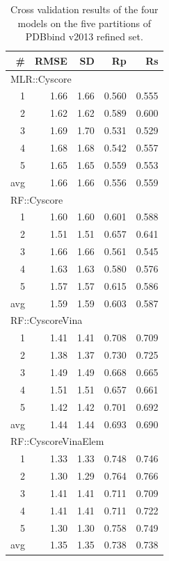 \documentclass[journal=jacsat,manuscript=article]{achemso}
\begin{document}
\begin{table}
\caption{Cross validation results of the four models on the five partitions of PDBbind v2013 refined set.}
\label{tbl:cv}
\begin{tabular}{rrrrr}
\hline
\# & RMSE & SD & Rp & Rs\\
\hline
\multicolumn{5}{l}{MLR::Cyscore}\\
  1 & 1.66 & 1.66 & 0.560 & 0.555\\
  2 & 1.62 & 1.62 & 0.589 & 0.600\\
  3 & 1.69 & 1.70 & 0.531 & 0.529\\
  4 & 1.68 & 1.68 & 0.542 & 0.557\\
  5 & 1.65 & 1.65 & 0.559 & 0.553\\
avg & 1.66 & 1.66 & 0.556 & 0.559\\
\hline
\multicolumn{5}{l}{RF::Cyscore}\\
  1 & 1.60 & 1.60 & 0.601 & 0.588\\
  2 & 1.51 & 1.51 & 0.657 & 0.641\\
  3 & 1.66 & 1.66 & 0.561 & 0.545\\
  4 & 1.63 & 1.63 & 0.580 & 0.576\\
  5 & 1.57 & 1.57 & 0.615 & 0.586\\
avg & 1.59 & 1.59 & 0.603 & 0.587\\
\hline
\multicolumn{5}{l}{RF::CyscoreVina}\\
  1 & 1.41 & 1.41 & 0.708 & 0.709\\
  2 & 1.38 & 1.37 & 0.730 & 0.725\\
  3 & 1.49 & 1.49 & 0.668 & 0.665\\
  4 & 1.51 & 1.51 & 0.657 & 0.661\\
  5 & 1.42 & 1.42 & 0.701 & 0.692\\
avg & 1.44 & 1.44 & 0.693 & 0.690\\
\hline
\multicolumn{5}{l}{RF::CyscoreVinaElem}\\
  1 & 1.33 & 1.33 & 0.748 & 0.746\\
  2 & 1.30 & 1.29 & 0.764 & 0.766\\
  3 & 1.41 & 1.41 & 0.711 & 0.709\\
  4 & 1.41 & 1.41 & 0.711 & 0.722\\
  5 & 1.30 & 1.30 & 0.758 & 0.749\\
avg & 1.35 & 1.35 & 0.738 & 0.738\\
\hline
\end{tabular}
\end{table}
\end{document}
